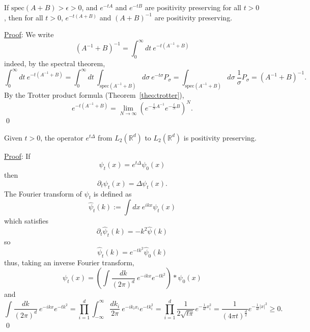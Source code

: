 \documentclass{ian}
\begin{document}
\label{lemma:add_inv}
  If $\mathrm{spec}(A+B)>\epsilon>0$, and $e^{-tA}$ and $e^{-t B}$ are positivity preserving for all $t>0$, then for all $t>0$, $e^{-t(A+B)}$ and $(A+B)^{-1}$ are positivity preserving.
\endtheo
\bigskip

\indent\underline{Proof}:
  We write
  \begin{equation}
    (A^{-1}+B)^{-1}
    =
    \int_0^\infty dt\ e^{-t(A^{-1}+B)}
  \end{equation}
  indeed, by the spectral theorem,
  \begin{equation}
    \int_0^\infty dt\ e^{-t(A^{-1}+B)}
    =
    \int_0^\infty dt\ \int_{\mathrm{spec}(A^{-1}+B)}d\sigma\ e^{-t\sigma}P_\sigma
    =
    \int_{\mathrm{spec}(A^{-1}+B)}d\sigma\ \frac1\sigma P_\sigma
    =(A^{-1}+B)^{-1}
    .
  \end{equation}
  By the Trotter product formula (Theorem\-~\ref{theo:trotter}),
  \begin{equation}
    e^{-t(A^{-1}+B)}
    =
    \lim_{N\to\infty}(e^{-\frac tNA^{-1}}e^{-\frac tNB})^N
    .
  \end{equation}
\qed
\bigskip

\label{theo:heat}
  Given $t>0$, the operator $e^{t\Delta}$ from $L_2(\mathbb R^d)$ to $L_2(\mathbb R^d)$ is positivity preserving.
\endtheo
\bigskip

\indent\underline{Proof}:
  If
  \begin{equation}
    \psi_t(x)=e^{t\Delta}\psi_0(x)
  \end{equation}
  then
  \begin{equation}
    \partial_t\psi_t(x)=\Delta\psi_t(x)
    .
  \end{equation}
  The Fourier transform of $\psi_t$ is defined as
  \begin{equation}
    \hat\psi_t(k):=\int dx\ e^{ikx}\psi_t(x)
  \end{equation}
  which satisfies
  \begin{equation}
    \partial_t\hat\psi_t(k)=-k^2\hat\psi(k)
  \end{equation}
  so
  \begin{equation}
    \hat\psi_t(k)=e^{-tk^2}\hat\psi_0(k)
  \end{equation}
  thus, taking an inverse Fourier transform,
  \begin{equation}
    \psi_t(x)=\left(\int\frac{dk}{(2\pi)^d}\ e^{-ikx}e^{-tk^2}\right)\ast\psi_0(x)
  \end{equation}
  and
  \begin{equation}
    \int\frac{dk}{(2\pi)^d}\ e^{-ikx}e^{-tk^2}
    =\prod_{i=1}^d\int_{-\infty}^\infty\frac{dk_i}{2\pi}\ e^{-ik_ix_i}e^{-tk_i^2}
    =\prod_{i=1}^d\frac1{2\sqrt{t\pi}}e^{-\frac1{4t}x_i^2}
    =\frac1{(4\pi t)^{\frac d2}}e^{-\frac1{4t}|x|^2}
    \geqslant 0
    .
  \end{equation}
\qed
\bigskip
\end{document}
